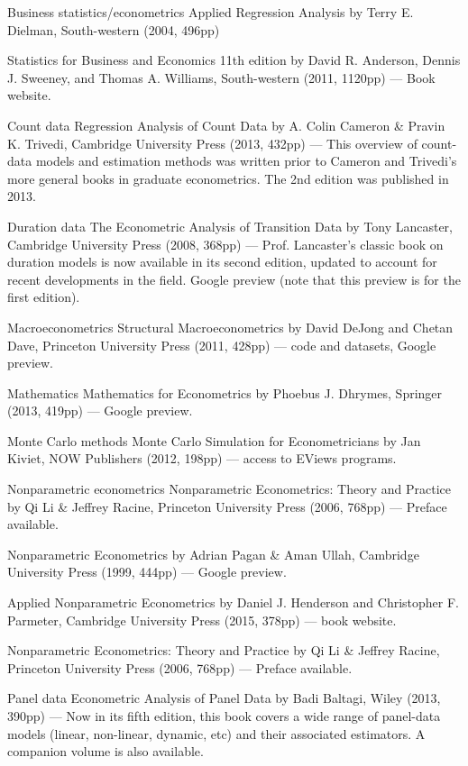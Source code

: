 Business statistics/econometrics
Applied Regression Analysis by Terry E. Dielman, South-western (2004, 496pp)

Statistics for Business and Economics 11th edition by David R. Anderson, Dennis J. Sweeney, and Thomas A. Williams, South-western (2011, 1120pp) --- Book website.

Count data
Regression Analysis of Count Data by A. Colin Cameron & Pravin K. Trivedi, Cambridge University Press (2013, 432pp) --- This overview of count-data models and estimation methods was written prior to Cameron and Trivedi's more general books in graduate econometrics.  The 2nd edition was published in 2013.

Duration data
The Econometric Analysis of Transition Data by Tony Lancaster, Cambridge University Press (2008, 368pp) --- Prof. Lancaster's classic book on duration models is now available in its second edition, updated to account for recent developments in the field.  Google preview (note that this preview is for the first edition).

Macroeconometrics
Structural Macroeconometrics by David DeJong and Chetan Dave, Princeton University Press (2011, 428pp) --- code and datasets, Google preview.

Mathematics
Mathematics for Econometrics by Phoebus J. Dhrymes, Springer (2013, 419pp) --- Google preview.

Monte Carlo methods
Monte Carlo Simulation for Econometricians by Jan Kiviet, NOW Publishers (2012, 198pp) --- access to EViews programs.

Nonparametric econometrics
Nonparametric Econometrics: Theory and Practice by Qi Li & Jeffrey Racine, Princeton University Press (2006, 768pp) --- Preface available. 

Nonparametric Econometrics by Adrian Pagan & Aman Ullah, Cambridge University Press (1999, 444pp) --- Google preview.

Applied Nonparametric Econometrics by Daniel J. Henderson and Christopher F. Parmeter, Cambridge University Press (2015, 378pp) --- book website.

Nonparametric Econometrics: Theory and Practice by Qi Li & Jeffrey Racine, Princeton University Press (2006, 768pp) --- Preface available. 

Panel data
Econometric Analysis of Panel Data by Badi Baltagi, Wiley (2013, 390pp) --- Now in its fifth edition, this book covers a wide range of panel-data models (linear, non-linear, dynamic, etc) and their associated estimators.  A companion volume is also available.

